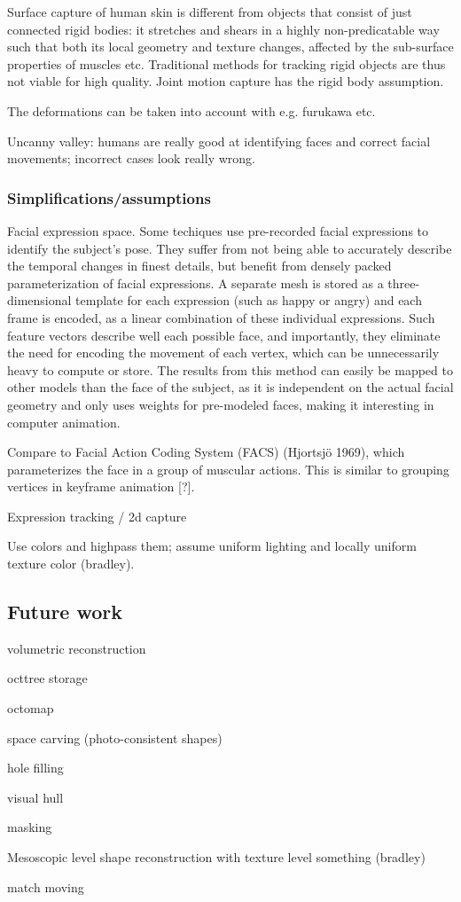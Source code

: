 Surface capture of human skin is different from objects that consist of just connected rigid bodies: it stretches and shears in a highly non-predicatable way such that both its local geometry and texture changes, affected by the sub-surface properties of muscles etc.
Traditional methods for tracking rigid objects are thus not viable for high quality.
Joint motion capture has the rigid body assumption.

The deformations can be taken into account with e.g. furukawa etc.

Uncanny valley: humans are really good at identifying faces and correct facial movements; incorrect cases look really wrong.

\subsubsection{Simplifications/assumptions}

Facial expression space. Some techiques \cite{faceshift,something} use pre-recorded facial expressions to identify the subject's pose.
They suffer from not being able to accurately describe the temporal changes in finest details, but benefit from densely packed parameterization of facial expressions.
A separate mesh is stored as a three-dimensional template for each expression (such as happy or angry) and each frame is encoded, as a linear combination of these individual expressions.
Such feature vectors describe well each possible face, and importantly, they eliminate the need for encoding the movement of each vertex, which can be unnecessarily heavy to compute or store.
The results from this method can easily be mapped to other models than the face of the subject, as it is independent on the actual facial geometry and only uses weights for pre-modeled faces, making it interesting in computer animation.

Compare to Facial Action Coding System (FACS) (Hjortsjö 1969), which parameterizes the face in a group of muscular actions. This is similar to grouping vertices in keyframe animation [?].

Expression tracking / 2d capture

Use colors and highpass them; assume uniform lighting and locally uniform texture color (bradley).

\subsection{Future work}

volumetric reconstruction

octtree storage

octomap

space carving (photo-consistent shapes)

hole filling

visual hull

masking

Mesoscopic level shape reconstruction with texture level something (bradley)

match moving
